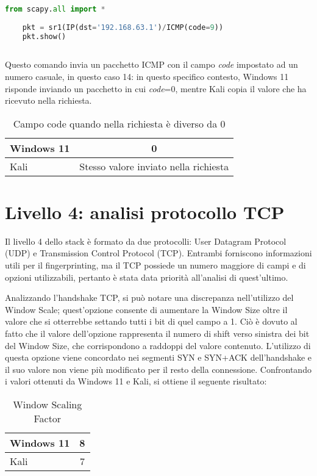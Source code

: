 \begin{lstlisting}[language=Python, caption={Comando Python per l'invio del pacchetto}]
	from scapy.all import *
	
	pkt = sr1(IP(dst='192.168.63.1')/ICMP(code=9))
	pkt.show()
	
\end{lstlisting}
Questo comando invia un pacchetto ICMP con il campo \textit{code} impostato ad un numero casuale, in questo caso 14: in questo specifico contesto, Windows 11 risponde inviando un pacchetto in cui \textit{code}=0, mentre Kali copia il valore che ha ricevuto nella richiesta.

\begin{table}[h]
	\centering
	\begin{tabular}{  l | c }
		\hline
		\rowcolor{blue!10} Windows 11 & 0
		\\
		\hline
		\rowcolor{red!10} Kali & Stesso valore inviato nella richiesta
		\\
		\hline

	\end{tabular}
	\caption{Campo code quando nella richiesta è diverso da 0}
	\label{tab:code}
\end{table}

\section{Livello 4: analisi protocollo TCP}
Il livello 4 dello stack è formato da due protocolli: User Datagram Protocol (UDP) e Transmission Control Protocol (TCP). Entrambi forniscono informazioni utili per il fingerprinting, ma il TCP possiede un numero maggiore di campi e di opzioni utilizzabili, pertanto è stata data priorità all'analisi di quest'ultimo.

Analizzando l'handshake TCP, si può notare una discrepanza nell'utilizzo del Window Scale; quest'opzione consente di aumentare la Window Size oltre il valore che si otterrebbe settando tutti i bit di quel campo a 1.
Ciò è dovuto al fatto che il valore dell'opzione rappresenta il numero di shift verso sinistra dei bit del Window Size, che corrispondono a raddoppi del valore contenuto. 
L'utilizzo di questa opzione viene concordato nei segmenti SYN e SYN+ACK dell'handshake e il suo valore non viene più modificato per il resto della connessione. Confrontando i valori ottenuti da Windows 11 e Kali, si ottiene il seguente risultato:
\\
\begin{table}[htb]
	\centering
	\begin{tabular}{ l | c }
		\hline
		\rowcolor{blue!10} Windows 11 & 8
		\\
		\hline
		\rowcolor{red!10} Kali & 7
		\\
		\hline
		
	\end{tabular}
	\caption{Window Scaling Factor}
	\label{tab:Window Scale}
\end{table}

